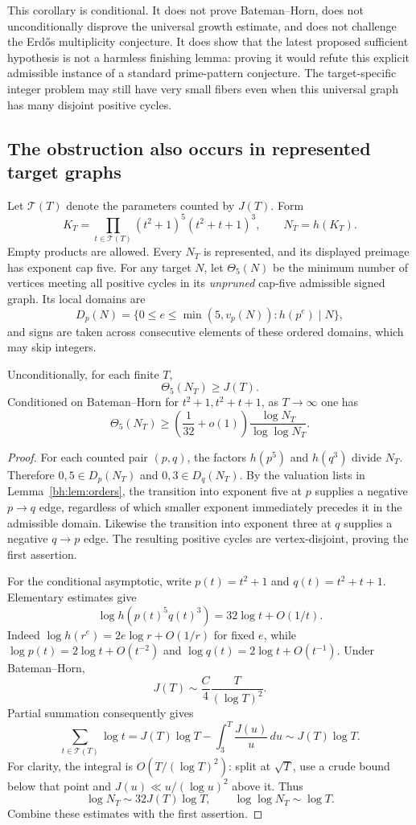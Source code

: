 This corollary is conditional. It does not prove Bateman--Horn, does not unconditionally disprove the universal growth estimate, and does not challenge the Erd\H{o}s multiplicity conjecture. It does show that the latest proposed sufficient hypothesis is not a harmless finishing lemma: proving it would refute this explicit admissible instance of a standard prime-pattern conjecture. The target-specific integer problem may still have very small fibers even when this universal graph has many disjoint positive cycles.

\subsection{The obstruction also occurs in represented target graphs}
Let $\mathcal T(T)$ denote the parameters counted by $J(T)$. Form
\[
 K_T=\prod_{t\in\mathcal T(T)}(t^2+1)^5(t^2+t+1)^3,
 \qquad N_T=h(K_T).
\]
Empty products are allowed. Every $N_T$ is represented, and its displayed preimage has exponent cap five.
For any target $N$, let $\Theta_5(N)$ be the minimum number of vertices meeting all positive cycles in its \emph{unpruned} cap-five admissible signed graph. Its local domains are
\[
 D_p(N)=\{0\le e\le\min(5,v_p(N)):h(p^e)\mid N\},
\]
and signs are taken across consecutive elements of these ordered domains, which may skip integers.

\begin{proposition}\label{bh:prop:targetcycles}
Unconditionally, for each finite $T$,
\[
 \boxed{\Theta_5(N_T)\ge J(T).}
\]
Conditioned on Bateman--Horn for $t^2+1,t^2+t+1$, as $T\to\infty$ one has
\[
 \boxed{\Theta_5(N_T)\ge
 \left(\frac1{32}+o(1)\right)
 \frac{\log N_T}{\log\log N_T}.}
\]
\end{proposition}
\begin{proof}
For each counted pair $(p,q)$, the factors $h(p^5)$ and $h(q^3)$ divide $N_T$. Therefore $0,5\in D_p(N_T)$ and $0,3\in D_q(N_T)$. By the valuation lists in Lemma~\ref{bh:lem:orders}, the transition into exponent five at $p$ supplies a negative $p\to q$ edge, regardless of which smaller exponent immediately precedes it in the admissible domain. Likewise the transition into exponent three at $q$ supplies a negative $q\to p$ edge. The resulting positive cycles are vertex-disjoint, proving the first assertion.

For the conditional asymptotic, write $p(t)=t^2+1$ and $q(t)=t^2+t+1$. Elementary estimates give
\[
 \log h(p(t)^5q(t)^3)=32\log t+O(1/t).
\]
Indeed $\log h(r^e)=2e\log r+O(1/r)$ for fixed $e$, while $\log p(t)=2\log t+O(t^{-2})$ and $\log q(t)=2\log t+O(t^{-1})$. Under Bateman--Horn,
\[
 J(T)\sim\frac C4\frac{T}{(\log T)^2}.
\]
Partial summation consequently gives
\[
 \sum_{t\in\mathcal T(T)}\log t
 =J(T)\log T-\int_3^T\frac{J(u)}u\,du
 \sim J(T)\log T.
\]
For clarity, the integral is $O(T/(\log T)^2)$: split at $\sqrt T$, use a crude bound below that point and $J(u)\ll u/(\log u)^2$ above it. Thus
\[
 \log N_T\sim32J(T)\log T,
 \qquad \log\log N_T\sim\log T.
\]
Combine these estimates with the first assertion.
\end{proof}

